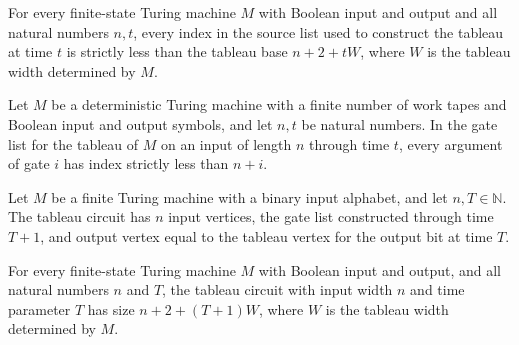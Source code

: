 \begin{theorem}
\label{Complexity.tableauSources_lt}
\leanok
{}
For every finite-state Turing machine $M$ with Boolean input and output and all natural
numbers $n,t$, every index in the source list used to construct the tableau at time $t$
is strictly less than the tableau base $n+2+tW$, where $W$ is the tableau width
determined by $M$.
\end{theorem}

\begin{theorem}
\label{Complexity.gatesAcyclic_tableauGates}
\leanok
{}
Let $M$ be a deterministic Turing machine with a finite number of work tapes and Boolean
input and output symbols, and let $n,t$ be natural numbers. In the gate list for the
tableau of $M$ on an input of length $n$ through time $t$, every argument of gate $i$
has index strictly less than $n+i$.
\end{theorem}

\begin{definition}
\label{Complexity.tableauCircuit}
\leanok
{}
Let $M$ be a finite Turing machine with a binary input alphabet, and let
$n,T\in\mathbb{N}$. The tableau circuit has $n$ input vertices, the gate list
constructed through time $T+1$, and output vertex equal to the tableau vertex for the
output bit at time $T$.
\end{definition}

\begin{theorem}
\label{Complexity.tableauCircuit_size}
\leanok
{}
For every finite-state Turing machine $M$ with Boolean input and output, and all natural
numbers $n$ and $T$, the tableau circuit with input width $n$ and time parameter $T$ has
size $n+2+(T+1)W$, where $W$ is the tableau width determined by $M$.
\end{theorem}

